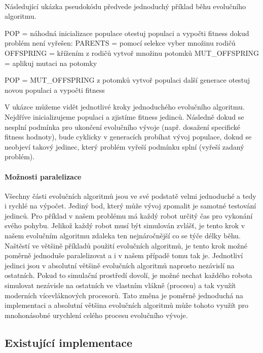 \paragraph{}
Následující ukázka pseudokódu předvede jednoduchý příklad běhu evolučního
algoritmu. 
\pagebreak
\begin{code}
POP = náhodná inicializace populace
otestuj populaci a vypočti fitness
dokud problém není vyřešen:
    PARENTS = pomocí selekce vyber množinu rodičů
    OFFSPRING = křížením z rodičů vytvoř množinu potomků
    MUT_OFFSPRING = aplikuj mutaci na potomky 

    POP = MUT_OFFSPRING z potomků vytvoř populaci další generace
    otestuj novou populaci a vypočti fitness
\end{code}

V ukázce můžeme vidět jednotlivé kroky jednoduchého evolučního algoritmu.
Nejdříve inicializujeme populaci a zjistíme fitness jedinců. Následně dokud se
nesplní podmínka pro ukončení evolučního vývoje (např. dosažení specifické
fitness hodnoty), bude cyklicky v generacích probíhat vývoj populace, dokud se
neobjeví takový jedinec, který problém vyřeší podmínku splní (vyřeší zadaný
problém).

\paragraph{Možnosti paralelizace}
Všechny části evolučních algoritmů jsou ve své podstatě velmi jednoduché a tedy
i rychlé na výpočet. Jediný bod, který může vývoj zpomalit je samotné testování
jedinců. Pro příklad v našem problému má každý robot určitý čas pro vykonání
svého pohybu. Jelikož každý robot musí být simulován zvlášť, je tento krok v
našem evolučním algoritmu zdaleka ten nejnáročnější co se týče délky běhu.
Naštěstí ve většině příkladů použití evolučních algoritmů, je tento krok možné
poměrně jednoduše paralelizovat a i v našem případě tomu tak je. Jednotliví
jedinci jsou v absolutní většině evolučních algoritmů naprosto nezávislí na
ostatních. Pokud to simulační prostředí dovolí, je možné nechat každého robota
simulovat nezávisle na ostatních ve vlastním vlákně (procesu) a tak využít
moderních vícevláknových procesorů. Tato změna je poměrně jednoduchá na
implementaci a absolutní většina evolučních algoritmů může tohoto využít pro
mnohonásobné urychlení celého procesu evolučního vývoje.

\subsection{Existující implementace} \label{EA-impl}

